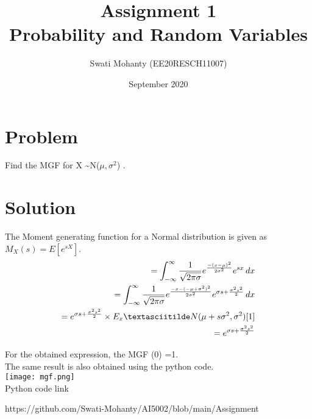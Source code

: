 \documentclass[journal,12pt,twocolumn]{IEEEtran}
\title{Assignment 1
\\Probability and Random Variables }
\author{Swati Mohanty (EE20RESCH11007) }
\date{September 2020}
\begin{document}
\maketitle


\section{Problem}
Find the MGF for X \textasciitilde N(${\mu,\sigma^2}$)
.
\section{Solution}
The Moment generating function for a Normal distribution is given as ${M_X(s) = E[e^{sX}]}$.
\begin{align}
    = \int_{-\infty}^{\infty} \frac{1}{\sqrt{2\pi\sigma}}e^{\frac{-(x-\mu)^2}{2\sigma^2}}e^{ sx} \,dx 
    \\ = \int_{-\infty}^{\infty} \frac{1}{\sqrt{2\pi\sigma}}e^{\frac{-x-
    (-\mu+\sigma^2)^2}{2\sigma^2}}e^{ \sigma s + \frac{\sigma^2 s^2}{2}} \,dx 
    \\ = e^{ \sigma s + \frac{\sigma^2 s^2}{2}} \times E_x \textasciitilde N(\mu+ s\sigma^2 ,\sigma^2)[1]
    \\= e^{ \sigma s + \frac{\sigma^2 s^2}{2}}
\end{align}

For the obtained expression, the MGF (0) =1.
\\The same result is also obtained using the python code.
\\\texttt{[image: mgf.png]}
\\Python code link 

https://github.com/Swati-Mohanty/AI5002/blob/main/Assignment%
\end{document}
